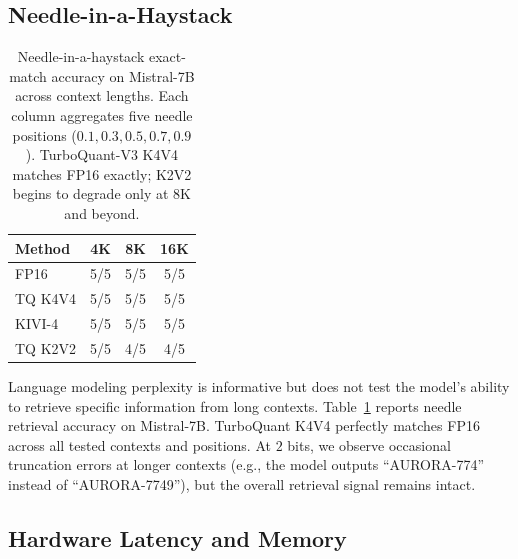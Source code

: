 \documentclass[11pt]{article}
\begin{document}
\subsection{Needle-in-a-Haystack}
\label{sec:needle}

\begin{table}[t]
\centering
\caption{Needle-in-a-haystack exact-match accuracy on Mistral-7B across context lengths. Each column aggregates five needle positions ($0.1, 0.3, 0.5, 0.7, 0.9$). TurboQuant-V3 K4V4 matches FP16 exactly; K2V2 begins to degrade only at $8$K and beyond.}
\label{tab:needle}
\begin{tabular}{l c c c}
\toprule
Method & 4K & 8K & 16K \\
\midrule
FP16 & 5/5 & 5/5 & 5/5 \\
TQ K4V4 & 5/5 & 5/5 & 5/5 \\
KIVI-4 & 5/5 & 5/5 & 5/5 \\
TQ K2V2 & 5/5 & 4/5 & 4/5 \\
\bottomrule
\end{tabular}
\end{table}

Language modeling perplexity is informative but does not test the model's ability to retrieve specific information from long contexts. Table~\ref{tab:needle} reports needle retrieval accuracy on Mistral-7B. TurboQuant K4V4 perfectly matches FP16 across all tested contexts and positions. At $2$ bits, we observe occasional truncation errors at longer contexts (e.g., the model outputs ``AURORA-774'' instead of ``AURORA-7749''), but the overall retrieval signal remains intact.

\subsection{Hardware Latency and Memory}
\label{sec:hardware}
\end{document}
